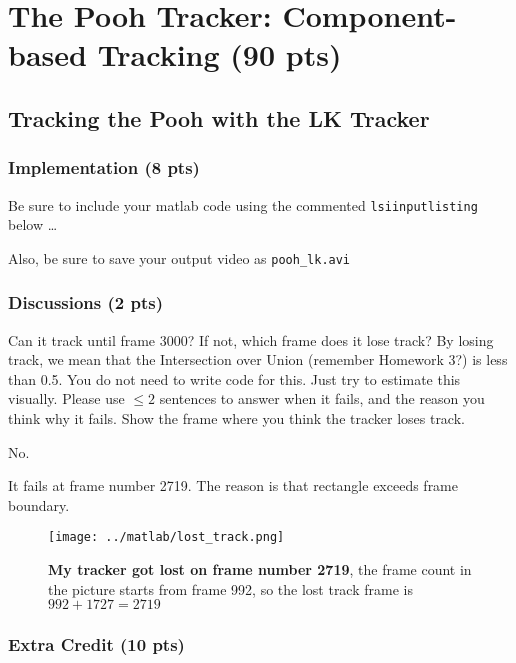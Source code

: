 \documentclass[12pt]{article}
\renewcommand{\thesubsection}{\bf Question \arabic{section}.\arabic{subsection}}
\newcounter{list}
\begin{document}
\section{The Pooh Tracker: Component-based Tracking (90 pts)}

\renewcommand{\thesubsection}{\arabic{section}.\arabic{subsection}}

\subsection{Tracking the Pooh with the LK Tracker}

\subsubsection{Implementation (8 pts)\\}

Be sure to include your matlab code using the commented \verb+lsiinputlisting+  below \ldots


Also, be sure to save your output video as \verb+pooh_lk.avi+


\subsubsection{Discussions (2 pts)\\}
\label{disc2}

Can it track until frame 3000? If not, which frame does it lose track? By losing track, we mean that the Intersection
over Union (remember Homework 3?) is less than 0.5. You do not need to write code for this. Just try to estimate this
visually. Please use $\leq 2$ sentences to answer when it fails, and the reason you think why it fails. Show the frame
where you think the tracker loses track.

No.

It fails at frame number 2719. The reason is that rectangle exceeds frame boundary.  

\begin{figure}[ht]
  \centering \texttt{[image: ../matlab/lost\_track.png]}
  \caption{{\bf My tracker got lost on frame number 2719}, the frame count in the picture starts from frame 992, so the lost track frame is $992+1727 = 2719$}
  \label{lostinspace}
\end{figure}


\subsubsection{Extra Credit (10 pts)\\}
\end{document}
